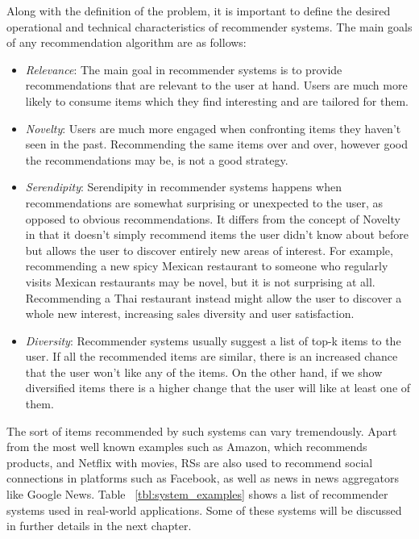 \documentclass[cic,tc,english]{iiufrgs}
\begin{document}
Along with the definition of the problem, it is important to define the desired operational and technical characteristics of recommender systems. The main goals of any recommendation algorithm are as follows:
\begin{itemize}
\item \emph{Relevance}: The main goal in recommender systems is to provide recommendations that are relevant to the user at hand. Users are much more likely to consume items which they find interesting and are tailored for them.
\item \emph{Novelty}: Users are much more engaged when confronting items they haven't seen in the past. Recommending the same items over and over, however good the recommendations may be, is not a good strategy.
\item \emph{Serendipity}: Serendipity in recommender systems happens when recommendations are somewhat surprising or unexpected to the user, as opposed to obvious recommendations. It differs from the concept of Novelty in that it doesn't simply recommend items the user didn't know about before but allows the user to discover entirely new areas of interest. For example, recommending a new spicy Mexican restaurant to someone who regularly visits Mexican restaurants may be novel, but it is not surprising at all. Recommending a Thai restaurant instead might allow the user to discover a whole new interest, increasing sales diversity and user satisfaction.
\item \emph{Diversity}: Recommender systems usually suggest a list of top-k items to the user. If all the recommended items are similar, there is an increased chance that the user won't like any of the items. On the other hand, if we show diversified items there is a higher change that the user will like at least one of them.
\end{itemize}

The sort of items recommended by such systems can vary tremendously. Apart from the most well known examples such as Amazon, which recommends products, and Netflix with movies, RSs are also used to recommend social connections in platforms such as Facebook, as well as news in news aggregators like Google News. Table  ~\ref{tbl:system_examples} shows a list of recommender systems used in real-world applications. Some of these systems will be discussed in further details in the next chapter.
\end{document}
